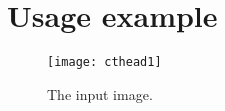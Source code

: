 \documentclass{InsightArticle}
\begin{document}
\section{Usage example}









\begin{figure}[htbp]
\centering
\texttt{[image: cthead1]}
\caption{The input image.\label{cthead1}}
\end{figure}


\appendix





\nocite{ITKSoftwareGuide}
\end{document}
